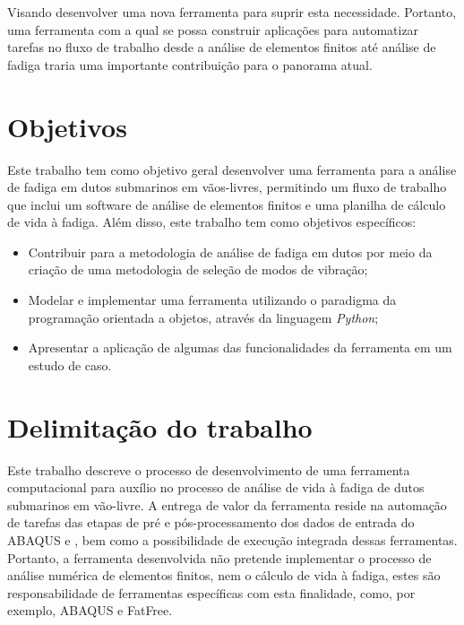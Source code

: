 Visando desenvolver uma nova ferramenta para suprir esta necessidade. Portanto, uma ferramenta com a qual se possa construir aplicações para automatizar tarefas no fluxo de trabalho desde a análise de elementos finitos até análise de fadiga traria uma importante contribuição para o panorama atual. %


\section{Objetivos}


Este trabalho tem como objetivo geral desenvolver uma ferramenta para a análise de fadiga em dutos submarinos em vãos-livres, permitindo um fluxo de trabalho que inclui um software de análise de elementos finitos e uma planilha de cálculo de vida à fadiga.
Além disso, este trabalho tem como objetivos específicos:

\begin{itemize}
    \item Contribuir para a metodologia de análise de fadiga em dutos por meio da criação de uma metodologia de seleção de modos de vibração;
    \item Modelar e implementar uma ferramenta utilizando o paradigma da programação orientada a objetos, através da linguagem \textit{Python};
    \item Apresentar a aplicação de algumas das funcionalidades da ferramenta em um estudo de caso.
\end{itemize}


\section{Delimitação do trabalho}


Este trabalho descreve o processo de desenvolvimento de uma ferramenta computacional para auxílio no processo de análise de vida à fadiga de dutos submarinos em vão-livre. A entrega de valor da ferramenta reside na automação de tarefas das etapas de pré e pós-processamento dos dados de entrada do ABAQUS e \fatfree, bem como a possibilidade de execução integrada dessas ferramentas. Portanto, a ferramenta desenvolvida não pretende implementar o processo de análise numérica de elementos finitos, nem o cálculo de vida à fadiga, estes são responsabilidade de ferramentas específicas com esta finalidade, como, por exemplo, ABAQUS e FatFree.



